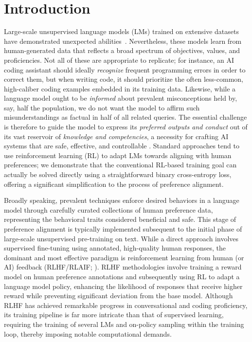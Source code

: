 \section{Introduction}
Large-scale unsupervised language models (LMs) trained on extensive datasets have demonstrated unexpected abilities~\citep{chowdhery2022palm, brown2020language, touvron2023llama, bubeck2023sparks}. Nevertheless, these models learn from human-generated data that reflects a broad spectrum of objectives, values, and proficiencies. Not all of these are appropriate to replicate; for instance, an AI coding assistant should ideally \textit{recognize} frequent programming errors in order to correct them, but when writing code, it should prioritize the often less-common, high-caliber coding examples embedded in its training data. Likewise, while a language model ought to be \textit{informed} about prevalent misconceptions held by, say, half the population, we do not want the model to affirm such misunderstandings as factual in half of all related queries. The essential challenge is therefore to guide the model to express its \emph{preferred outputs and conduct} out of its vast reservoir of \textit{knowledge and competencies}, a necessity for crafting AI systems that are safe, effective, and controllable \citep{ouyang2022training}. Standard approaches tend to use reinforcement learning (RL) to adapt LMs towards aligning with human preferences; we demonstrate that the conventional RL-based training goal can actually be solved directly using a straightforward binary cross-entropy loss, offering a significant simplification to the process of preference alignment.

Broadly speaking, prevalent techniques enforce desired behaviors in a language model through carefully curated collections of human preference data, representing the behavioral traits considered beneficial and safe. This stage of preference alignment is typically implemented subsequent to the initial phase of large-scale unsupervised pre-training on text. While a direct approach involves supervised fine-tuning using annotated, high-quality human responses, the dominant and most effective paradigm is reinforcement learning from human (or AI) feedback (RLHF/RLAIF; \citep{christiano2017deep, bai2022constitutional}). RLHF methodologies involve training a reward model on human preference annotations and subsequently using RL to adapt a language model policy, enhancing the likelihood of responses that receive higher reward while preventing significant deviation from the base model. Although RLHF has achieved remarkable progress in conversational and coding proficiency, its training pipeline is far more intricate than that of supervised learning, requiring the training of several LMs and on-policy sampling within the training loop, thereby imposing notable computational demands.

